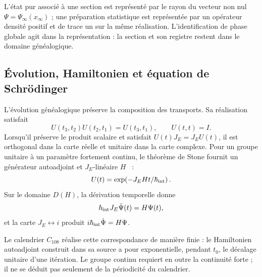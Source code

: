 \begin{principle}
\label{v:v:rec:realizacion_evolucion:statement:02}
L’état pur associé à une section est représenté par le rayon du vecteur
non nul \(\Psi=\Psi_\infty(x_\infty)\) ; une préparation statistique est
représentée par un opérateur densité positif et de trace un sur la même
réalisation. L’identification de phase globale agit dans la représentation :
la section et son registre restent dans le domaine généalogique.
\end{principle}

\subsection{Évolution, Hamiltonien et équation de Schrödinger}
\label{v:v:rec:realizacion_evolucion:section:03}

L’évolution généalogique préserve la composition des transports. Sa
réalisation satisfait
\[
 U(t_3,t_2)U(t_2,t_1)=U(t_3,t_1),
 \qquad U(t,t)=I.
\]
Lorsqu’il préserve le produit scalaire et satisfait
\(U(t)J_E=J_EU(t)\), il est orthogonal dans la carte réelle et unitaire dans la carte
complexe. Pour un groupe unitaire à un paramètre fortement continu, le
théorème de Stone fournit un générateur autoadjoint et \(J_E\)-linéaire
\(H\)~\cite{v:Stone1932} :
\[
 U(t)=\exp\!\left(-J_E H t/\hbar_{\rm int}\right).
\]
Sur le domaine \(D(H)\), la dérivation temporelle donne
\begin{equation}
 \hbar_{\rm int}J_E\dot\Psi(t)=H\Psi(t),
 \label{v:v:rec:eq:schrodinger-genealogico-rev2}
\end{equation}
et la carte \(J_E\leftrightarrow i\) produit
\(i\hbar_{\rm int}\dot\Psi=H\Psi\).

Le calendrier \(C_{108}\) réalise cette correspondance de manière finie :
le Hamiltonien autoadjoint construit dans sa source a pour
exponentielle, pendant \(t_0\), le décalage unitaire d’une itération. Le
groupe continu requiert en outre la continuité forte ; il ne se déduit pas
seulement de la périodicité du calendrier.
